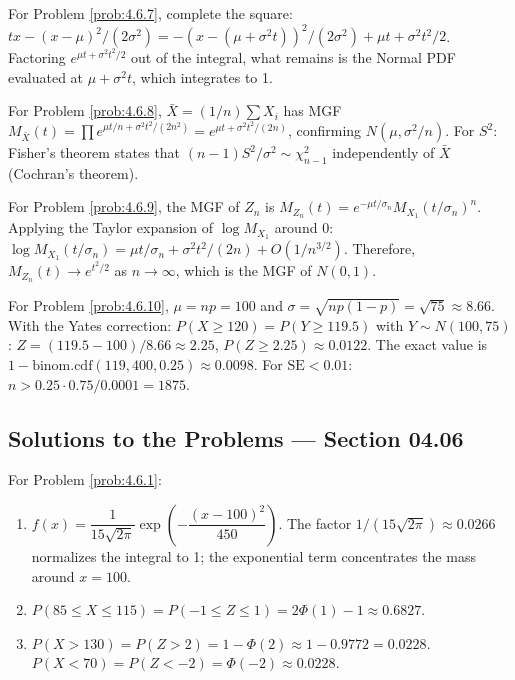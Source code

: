 \begin{sugerencia}
	\label{sug:4.6.7}
	For Problem \ref{prob:4.6.7}, complete the square: $tx - (x-\mu)^{2}/(2\sigma^{2}) = -(x - (\mu + \sigma^{2}t))^{2}/(2\sigma^{2}) + \mu t + \sigma^{2}t^{2}/2$. Factoring $e^{\mu t + \sigma^{2}t^{2}/2}$ out of the integral, what remains is the Normal PDF evaluated at $\mu + \sigma^{2}t$, which integrates to 1.
\end{sugerencia}

\begin{sugerencia}
	\label{sug:4.6.8}
	For Problem \ref{prob:4.6.8}, $\bar{X} = (1/n) \sum X_{i}$ has MGF $M_{\bar{X}}(t) = \prod e^{\mu t/n + \sigma^{2}t^{2}/(2n^{2})} = e^{\mu t + \sigma^{2}t^{2}/(2n)}$, confirming $N(\mu, \sigma^{2}/n)$. For $S^{2}$: Fisher's theorem states that $(n-1)S^{2}/\sigma^{2} \sim \chi^{2}_{n-1}$ independently of $\bar{X}$ (Cochran's theorem).
\end{sugerencia}

\begin{sugerencia}
	\label{sug:4.6.9}
	For Problem \ref{prob:4.6.9}, the MGF of $Z_{n}$ is $M_{Z_n}(t) = e^{-\mu t/\sigma_n} M_{X_{1}}(t/\sigma_n)^{n}$. Applying the Taylor expansion of $\log M_{X_{1}}$ around 0: $\log M_{X_{1}}(t/\sigma_n) = \mu t/\sigma_n + \sigma^{2}t^{2}/(2n) + O(1/n^{3/2})$. Therefore, $M_{Z_{n}}(t) \to e^{t^{2}/2}$ as $n \to \infty$, which is the MGF of $N(0, 1)$.
\end{sugerencia}

\begin{sugerencia}
	\label{sug:4.6.10}
	For Problem \ref{prob:4.6.10}, $\mu = np = 100$ and $\sigma = \sqrt{np(1-p)} = \sqrt{75} \approx 8.66$. With the Yates correction: $P(X \ge 120) = P(Y \ge 119.5)$ with $Y \sim N(100, 75)$: $Z = (119.5 - 100)/8.66 \approx 2.25$, $P(Z \ge 2.25) \approx 0.0122$. The exact value is $1 - \text{binom.cdf}(119, 400, 0.25) \approx 0.0098$. For $\text{SE} < 0.01$: $n > 0.25 \cdot 0.75/0.0001 = 1875$.
\end{sugerencia}

\subsection*{Solutions to the Problems --- Section 04.06}

\begin{solucion}
	\label{sol:4.6.1}
	For Problem \ref{prob:4.6.1}:
	\begin{enumerate}
		\item $f(x) = \dfrac{1}{15\sqrt{2\pi}} \exp\left(-\dfrac{(x-100)^{2}}{450}\right)$. The factor $1/(15\sqrt{2\pi}) \approx 0.0266$ normalizes the integral to 1; the exponential term concentrates the mass around $x = 100$.
		\item $P(85 \le X \le 115) = P(-1 \le Z \le 1) = 2\Phi(1) - 1 \approx 0.6827$.
		\item $P(X > 130) = P(Z > 2) = 1 - \Phi(2) \approx 1 - 0.9772 = 0.0228$. $P(X < 70) = P(Z < -2) = \Phi(-2) \approx 0.0228$.
	\end{enumerate}
\end{solucion}


